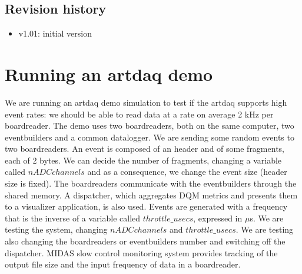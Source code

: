 \documentclass[12pt]{article}
\begin{document}
\subsection {Revision history} 
\begin{itemize}
\item
  v1.01: initial version
\end{itemize}
\newpage
\section{Running an artdaq demo}
We are running an artdaq demo simulation to test if the artdaq supports high event rates: we should be able to read data at a rate on average 2 kHz per boardreader. The demo uses two boardreaders, both on the same computer, two eventbuilders and a common datalogger. We are sending some random events to two boardreaders. An event is composed of an header and of some fragments, each of 2 bytes. We can decide the number of fragments, changing a variable called $nADCchannels$ and as a consequence, we change the event size (header size is fixed). The boardreaders communicate with the eventbuilders through the shared memory. A dispatcher, which aggregates DQM metrics and presents them to a visualizer application, is also used. Events are generated with a frequency that is the inverse of a variable called $throttle\_ usecs$, expressed in $\mu$s. We are testing the system, changing $nADCchannels$ and $throttle\_usecs$. We are testing also changing the boardreaders or eventbuilders number and switching off the dispatcher. MIDAS slow control monitoring system provides tracking of the output file size and the input frequency of data in a boardreader.
\end{document}
